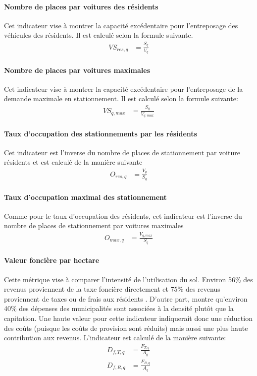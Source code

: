     \paragraph{Nombre de places par voitures des résidents} Cet indicateur vise à montrer la capacité excédentaire pour l'entreposage des véhicules des résidents. Il est calculé selon la formule suivante. 
    \begin{align}
        VS_{res,q} &= \frac{S_q}{V_q}
    \end{align}
    \paragraph{Nombre de places par voitures maximales} Cet indicateur vise à montrer la capacité excédentaire pour l'entreposage de la demande maximale en stationnement. Il est calculé selon la formule suivante:
    \begin{align}
        VS_{q,max} &=\frac{S_q}{V_{q,max}}
    \end{align}
    \paragraph{Taux d'occupation des stationnements par les résidents} Cet indicateur est l'inverse du nombre de places de stationnement par voiture résidents et est calculé de la manière suivante
    \begin{align}
        O_{res,q} &= \frac{V_q}{S_q}
    \end{align}
    \paragraph{Taux d'occupation maximal des stationnement} Comme pour le taux d'occupation des résidents, cet indicateur est l'inverse du nombre de places de stationnement par voitures maximales
    \begin{align}
        O_{max,q} &= \frac{V_{q,max}}{S_q}
    \end{align}
    \paragraph{Valeur foncière par hectare} Cette métrique vise à comparer l'intensité de l'utilisation du sol. Environ 56\% des revenus proviennent de la taxe foncière directement et 75\% des revenus proviennent de taxes ou de frais aux résidents \parencite{ville_de_quebec_budget_2025}. D'autre part, \textcite{metro_vancouver_regional_planning_cost_2023} montre qu'environ 40\% des dépenses des municipalités sont associées à la densité plutôt que la capitation. Une haute valeur pour cette indicateur indiquerait donc une réduction des coûts (puisque les coûts de provision sont réduits) mais aussi une plus haute contribution aux revenus. L'indicateur est calculé de la manière suivante:
    \begin{align}
        D_{f,T,q} &= \frac{F_{T,q}}{A_q}\\
        D_{f,R,q} &= \frac{F_{R,q}}{A_q}
    \end{align}